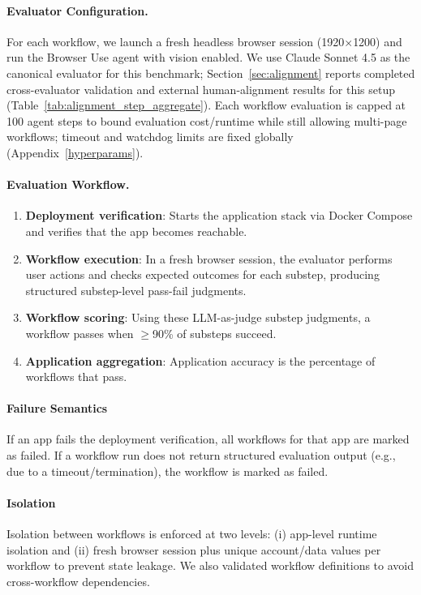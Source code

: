 \paragraph{Evaluator Configuration.}
For each workflow, we launch a fresh headless browser session (1920$\times$1200) and run the Browser Use agent with vision enabled. We use Claude Sonnet 4.5 as the canonical evaluator for this benchmark; Section~\ref{sec:alignment} reports completed cross-evaluator validation and external human-alignment results for this setup (Table~\ref{tab:alignment_step_aggregate}). Each workflow evaluation is capped at 100 agent steps to bound evaluation cost/runtime while still allowing multi-page workflows; timeout and watchdog limits are fixed globally (Appendix~\ref{hyperparams}).

\paragraph{Evaluation Workflow.}
\begin{enumerate}
    \item \textbf{Deployment verification}: Starts the application stack via Docker Compose and verifies that the app becomes reachable.
    \item \textbf{Workflow execution}: In a fresh browser session, the evaluator performs user actions and checks expected outcomes for each substep, producing structured substep-level pass-fail judgments.
    \item \textbf{Workflow scoring}: Using these LLM-as-judge substep judgments, a workflow passes when $\geq$90\% of substeps succeed.
    \item \textbf{Application aggregation}: Application accuracy is the percentage of workflows that pass.
\end{enumerate}

\paragraph{Failure Semantics}
If an app fails the deployment verification, all workflows for that app are marked as failed. If a workflow run does not return structured evaluation output (e.g., due to a timeout/termination), the workflow is marked as failed.

\paragraph{Isolation} Isolation between workflows is enforced at two levels: (i) app-level runtime isolation and (ii) fresh browser session plus unique account/data values per workflow to prevent state leakage. We also validated workflow definitions to avoid cross-workflow dependencies.

